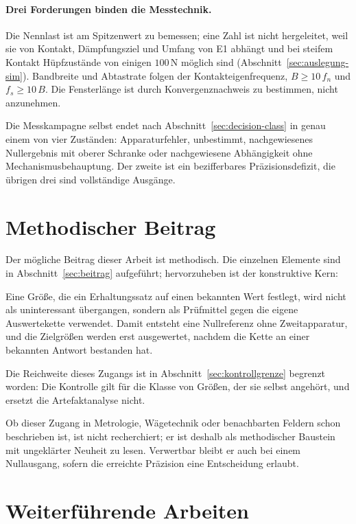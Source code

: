 \documentclass[12pt,a4paper]{report}
\begin{document}
\paragraph{Drei Forderungen binden die Messtechnik.} Die Nennlast ist am
Spitzenwert zu bemessen; eine Zahl ist nicht hergeleitet, weil sie von
Kontakt, Dämpfungsziel und Umfang von E1 abhängt und bei steifem Kontakt
Hüpfzustände von einigen $100\,\mathrm{N}$ möglich sind
(Abschnitt~\ref{sec:auslegung-sim}). Bandbreite und Abtastrate folgen der
Kontakteigenfrequenz, $B \geq 10\,f_n$ und $f_s \geq 10\,B$. Die
Fensterlänge ist durch Konvergenznachweis zu bestimmen, nicht
anzunehmen.

Die Messkampagne selbst endet nach
Abschnitt~\ref{sec:decision-class} in genau einem von vier Zuständen:
Apparaturfehler, unbestimmt, nachgewiesenes Nullergebnis mit oberer
Schranke oder nachgewiesene Abhängigkeit ohne Mechanismusbehauptung.
Der zweite ist ein bezifferbares Präzisionsdefizit, die übrigen drei
sind vollständige Ausgänge.

\section{Methodischer Beitrag}

Der mögliche Beitrag dieser Arbeit ist methodisch. Die einzelnen
Elemente sind in Abschnitt~\ref{sec:beitrag} aufgeführt; hervorzuheben
ist der konstruktive Kern:

Eine Größe, die ein Erhaltungssatz auf einen bekannten Wert festlegt,
wird nicht als uninteressant übergangen, sondern als Prüfmittel gegen die
eigene Auswertekette verwendet. Damit entsteht eine Nullreferenz ohne
Zweitapparatur, und die Zielgrößen werden erst ausgewertet, nachdem die
Kette an einer bekannten Antwort bestanden hat.

Die Reichweite dieses Zugangs ist in
Abschnitt~\ref{sec:kontrollgrenze} begrenzt worden: Die Kontrolle gilt
für die Klasse von Größen, der sie selbst angehört, und ersetzt die
Artefaktanalyse nicht.

Ob dieser Zugang in Metrologie, Wägetechnik oder benachbarten Feldern
schon beschrieben ist, ist nicht recherchiert; er ist deshalb als
methodischer Baustein mit ungeklärter Neuheit zu lesen. Verwertbar bleibt
er auch bei einem Nullausgang, sofern die erreichte Präzision eine
Entscheidung erlaubt.

\section{Weiterführende Arbeiten}
\label{sec:weiterfuehrend}
\end{document}
